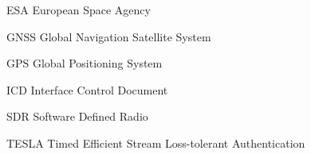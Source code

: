 \begin{abbreviations}

\item[ESA] European Space Agency
\item[GNSS] Global Navigation Satellite System
\item[GPS] Global Positioning System
\item[ICD] Interface Control Document
\item[SDR] Software Defined Radio
\item[TESLA] Timed Efficient Stream Loss-tolerant Authentication

\end{abbreviations}
